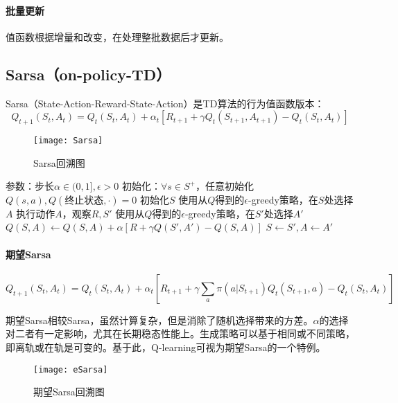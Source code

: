 \documentclass[
12pt, %
a4paper, 
oneside, %
headinclude,footinclude, %
]{scrartcl}
\begin{document}
\paragraph{批量更新}
值函数根据增量和改变，在处理整批数据后才更新。
\subsection{Sarsa（on-policy-TD）}
Sarsa（State-Action-Reward-State-Action）是TD算法的行为值函数版本：
$$ Q_{t + 1}(S_t, A_t) = Q_t(S_t, A_t) + \alpha_t[R_{t + 1} + \gamma Q_t(S_{t + 1}, A_{t + 1}) - Q_t(S_t, A_t)] $$

\begin{figure}[H]
\centering
\texttt{[image: Sarsa]}
\caption[Sarsa回溯图]{Sarsa回溯图}
\end{figure}
\begin{myalgorithm}
\State 参数：步长$ \alpha \in (0,1], \epsilon > 0 $
\State 初始化：$ \forall s \in S^+ $，任意初始化$ Q(s,a), Q(\text{终止状态}, \cdot) = 0 $
\State 初始化$ S $
\State 使用从$ Q $得到的$ \epsilon $-greedy策略，在$ S $处选择$ A $
\State 执行动作$ A $，观察$ R,S' $
\State 使用从$ Q $得到的$ \epsilon$-greedy策略，在$ S' $处选择$ A' $
\State $ Q(S, A) \gets Q(S, A) + \alpha [R + \gamma Q(S', A') - Q(S, A)] $
\State $ S \gets S', A \gets A' $
\EndWhile
\EndFor
\end{myalgorithm}
\paragraph{期望Sarsa}
$$ Q_{t + 1}(S_t, A_t) = Q_t(S_t, A_t) + \alpha_t[R_{t + 1} + \gamma \sum_a \pi(a|S_{t + 1}) Q_t(S_{t + 1}, a) - Q_t(S_t, A_t)] $$

\begin{minipage}{0.6\textwidth}
\hspace{2em}
期望Sarsa相较Sarsa，虽然计算复杂，但是消除了随机选择带来的方差。$ \alpha $的选择对二者有一定影响，尤其在长期稳态性能上。生成策略可以基于相同或不同策略，即离轨或在轨是可变的。基于此，Q-learning可视为期望Sarsa的一个特例。
\end{minipage}
\hfill
\begin{minipage}{0.35\textwidth}
\begin{figure}[H]
\centering
\texttt{[image: eSarsa]}
\caption[期望Sarsa回溯图]{期望Sarsa回溯图}
\end{figure}
\end{minipage}
\end{document}
